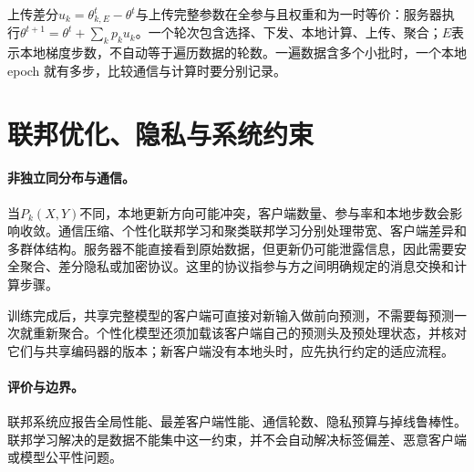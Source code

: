 上传差分$u_k=\theta_{k,E}^t-\theta^t$与上传完整参数在全参与且权重和为一时等价：服务器执行$\theta^{t+1}=\theta^t+\sum_kp_ku_k$。一个轮次包含选择、下发、本地计算、上传、聚合；$E$表示本地梯度步数，不自动等于遍历数据的轮数。一遍数据含多个小批时，一个本地 epoch 就有多步，比较通信与计算时要分别记录。

\section{联邦优化、隐私与系统约束}
\paragraph{非独立同分布与通信。}
当$P_k(X,Y)$不同，本地更新方向可能冲突，客户端数量、参与率和本地步数会影响收敛。通信压缩、个性化联邦学习和聚类联邦学习分别处理带宽、客户端差异和多群体结构。服务器不能直接看到原始数据，但更新仍可能泄露信息，因此需要安全聚合、差分隐私或加密协议。这里的协议指参与方之间明确规定的消息交换和计算步骤。

训练完成后，共享完整模型的客户端可直接对新输入做前向预测，不需要每预测一次就重新聚合。个性化模型还须加载该客户端自己的预测头及预处理状态，并核对它们与共享编码器的版本；新客户端没有本地头时，应先执行约定的适应流程。

\paragraph{评价与边界。}
联邦系统应报告全局性能、最差客户端性能、通信轮数、隐私预算与掉线鲁棒性。联邦学习解决的是数据不能集中这一约束，并不会自动解决标签偏差、恶意客户端或模型公平性问题。

\begin{table}[htbp]
\centering
\caption{联邦学习方法的约束匹配}
\label{tab:federated-method-constraints}
\scriptsize
\setlength{\tabcolsep}{3pt}
\end{table}

